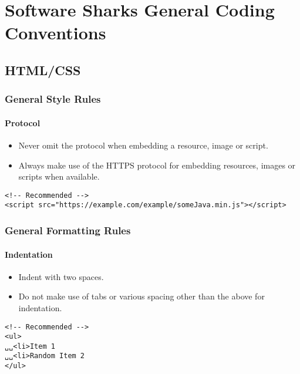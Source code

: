 \documentclass[a4paper, 11pt]{article}
\begin{document}
\pagebreak
\section{Software Sharks General Coding Conventions}
\subsection{HTML/CSS}
\subsubsection{General Style Rules}
\paragraph{Protocol}
\begin{itemize}
\item Never omit the protocol when embedding a resource, image or script.
\item Always make use of the HTTPS protocol for embedding resources, images or scripts when available. 
\end{itemize}

\begin{verbatim}
<!-- Recommended -->
<script src="https://example.com/example/someJava.min.js"></script>
\end{verbatim}

\subsubsection{General Formatting Rules}

\paragraph{Indentation}
\begin{itemize}
\item Indent with two spaces.
\item Do not make use of tabs or various spacing other than the above for indentation.
\end{itemize}
\begin{verbatim}
<!-- Recommended -->
<ul>
␣␣<li>Item 1
␣␣<li>Random Item 2
</ul>
\end{verbatim}
\end{document}
